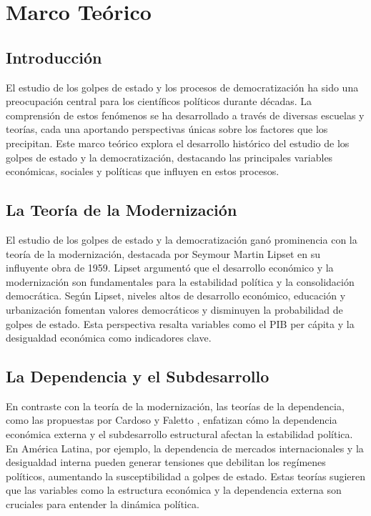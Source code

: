 \documentclass{article}
\begin{document}

\section{Marco Teórico}

\subsection{Introducción}

El estudio de los golpes de estado y los procesos de democratización ha sido una 
preocupación central para los científicos políticos durante décadas. La comprensión 
de estos fenómenos se ha desarrollado a través de diversas escuelas y teorías, cada 
una aportando perspectivas únicas sobre los factores que los precipitan. Este marco 
teórico explora el desarrollo histórico del estudio de los golpes de estado y la 
democratización, destacando las principales variables económicas, sociales y 
políticas que influyen en estos procesos.

\subsection{La Teoría de la Modernización}

El estudio de los golpes de estado y la democratización ganó prominencia con la 
teoría de la modernización, destacada por Seymour Martin Lipset en su influyente 
obra de 1959. Lipset \cite{lipset1959some} argumentó que el desarrollo económico y 
la modernización son fundamentales para la estabilidad política y la consolidación 
democrática. Según Lipset, niveles altos de desarrollo económico, educación y 
urbanización fomentan valores democráticos y disminuyen la probabilidad de golpes de 
estado. Esta perspectiva resalta variables como el PIB per cápita y la desigualdad 
económica como indicadores clave.

\subsection{La Dependencia y el Subdesarrollo}

En contraste con la teoría de la modernización, las teorías de la dependencia, como 
las propuestas por Cardoso y Faletto \cite{cardoso1979dependencia}, enfatizan cómo 
la dependencia económica externa y el subdesarrollo estructural afectan la 
estabilidad política. En América Latina, por ejemplo, la dependencia de mercados 
internacionales y la desigualdad interna pueden generar tensiones que debilitan los 
regímenes políticos, aumentando la susceptibilidad a golpes de estado. Estas teorías 
sugieren que las variables como la estructura económica y la dependencia externa son 
cruciales para entender la dinámica política.
\end{document}

